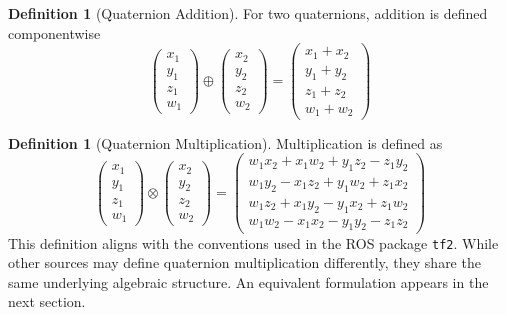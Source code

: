 \documentclass{amsart}
\theoremstyle{definition}
\newtheorem{definition}[theorem]{Definition}
\theoremstyle{remark}
\numberwithin{equation}{section}
\begin{document}
\begin{definition}[Quaternion Addition]
  For two quaternions, addition is defined componentwise
  \begin{equation}
    \begin{pmatrix}
      x_1 \\
      y_1 \\
      z_1 \\
      w_1
    \end{pmatrix} \oplus
    \begin{pmatrix}
      x_2 \\
      y_2 \\
      z_2 \\
      w_2
    \end{pmatrix} =
    \begin{pmatrix}
      x_1 + x_2 \\
      y_1 + y_2 \\
      z_1 + z_2 \\
      w_1 + w_2
    \end{pmatrix}
  \end{equation}
\end{definition}

\begin{definition}[Quaternion Multiplication]
  Multiplication is defined as
  \begin{equation} \label{eqn:multiplication}
    \begin{pmatrix}
      x_1 \\
      y_1 \\
      z_1 \\
      w_1
    \end{pmatrix} \otimes 
    \begin{pmatrix}
      x_2 \\
      y_2 \\
      z_2 \\
      w_2
    \end{pmatrix} =
    \begin{pmatrix}
      w_1x_2 + x_1w_2 + y_1z_2 - z_1y_2 \\
      w_1y_2 - x_1z_2 + y_1w_2 + z_1x_2 \\
      w_1z_2 + x_1y_2 - y_1x_2 + z_1w_2 \\
      w_1w_2 - x_1x_2 - y_1y_2 - z_1z_2
    \end{pmatrix}
  \end{equation}
  This definition aligns with the conventions used in the ROS package \texttt{tf2}.
  While other sources may define quaternion multiplication differently, they share the same underlying algebraic structure.
  An equivalent formulation appears in the next section.
\end{definition}
\end{document}
